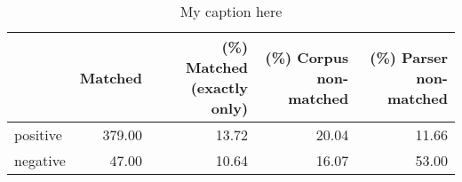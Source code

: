 \begin{table}[!ht]
\centering
\begin{tabular}{lrrrr}
\toprule
{} &  Matched &  (\%) Matched (exactly only) &  (\%) Corpus non-matched &  (\%) Parser non-matched \\
\midrule
positive &   379.00 &                       13.72 &                   20.04 &                   11.66 \\
negative &    47.00 &                       10.64 &                   16.07 &                   53.00 \\
\bottomrule
\end{tabular}
\caption{My caption here}
\label{tab:POLARITY-ocd-relative}
\end{table}